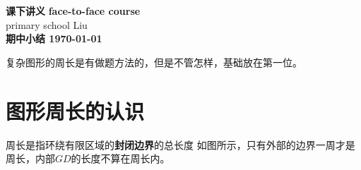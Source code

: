 \documentclass[DIN, pagenumber=false, fontsize=11pt, parskip=half]{scrartcl}
\newcommand{\mytitle}[1]{{\noindent\Large\textbf{#1}}}
\begin{document}
\noindent\textbf{课下讲义} \hfill \textbf{face-to-face course}\\
primary school \hfill Liu\\

\mytitle{期中小结 \hfill \today}
\newline
\begin{parchmentquote}
    复杂图形的周长是有做题方法的，但是不管怎样，基础放在第一位。
\end{parchmentquote}


\section{图形周长的认识}
周长是指环绕有限区域的\textbf{封闭边界}的总长度
\newline
如图所示，只有外部的边界一周才是周长，内部$GD$的长度不算在周长内。


\end{document}
